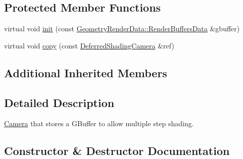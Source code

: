 \subsection*{Protected Member Functions}
\begin{DoxyCompactItemize}
\item 
virtual void \mbox{\hyperlink{class_geometry_engine_1_1_geometry_world_item_1_1_geometry_camera_1_1_deferred_shading_camera_a31f4f7af970df8edd71b15ed56bdc906}{init}} (const \mbox{\hyperlink{class_geometry_engine_1_1_geometry_render_data_1_1_render_buffers_data}{Geometry\+Render\+Data\+::\+Render\+Buffers\+Data}} \&gbuffer)
\item 
virtual void \mbox{\hyperlink{class_geometry_engine_1_1_geometry_world_item_1_1_geometry_camera_1_1_deferred_shading_camera_a00eba99af30625646ea11f442ffa2742}{copy}} (const \mbox{\hyperlink{class_geometry_engine_1_1_geometry_world_item_1_1_geometry_camera_1_1_deferred_shading_camera}{Deferred\+Shading\+Camera}} \&ref)
\end{DoxyCompactItemize}
\subsection*{Additional Inherited Members}


\subsection{Detailed Description}
\mbox{\hyperlink{class_geometry_engine_1_1_geometry_world_item_1_1_geometry_camera_1_1_camera}{Camera}} that stores a G\+Buffer to allow multiple step shading. 

\subsection{Constructor \& Destructor Documentation}
\mbox{\label{class_geometry_engine_1_1_geometry_world_item_1_1_geometry_camera_1_1_deferred_shading_camera_a4db0e4a5b0b5f0b24020897cb824fb57}} 

